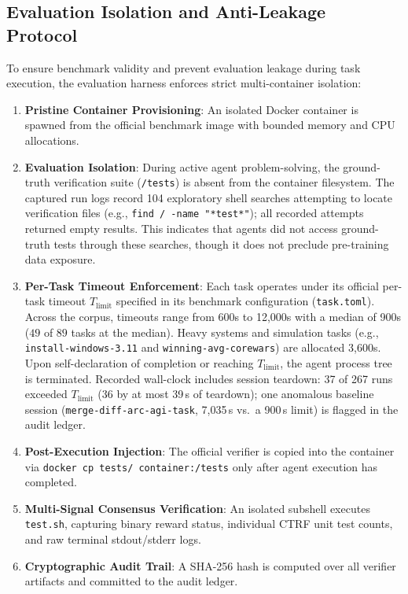 \subsection{Evaluation Isolation and Anti-Leakage Protocol}
To ensure benchmark validity and prevent evaluation leakage during task execution, the evaluation harness enforces strict multi-container isolation:
\begin{enumerate}
    \item \textbf{Pristine Container Provisioning}: An isolated Docker container is spawned from the official benchmark image with bounded memory and CPU allocations.
    \item \textbf{Evaluation Isolation}: During active agent problem-solving, the ground-truth verification suite (\texttt{/tests}) is absent from the container filesystem. The captured run logs record 104 exploratory shell searches attempting to locate verification files (e.g., \texttt{find / -name "*test*"}); all recorded attempts returned empty results. This indicates that agents did not access ground-truth tests through these searches, though it does not preclude pre-training data exposure.
    \item \textbf{Per-Task Timeout Enforcement}: Each task operates under its official per-task timeout $T_{\text{limit}}$ specified in its benchmark configuration (\texttt{task.toml}). Across the corpus, timeouts range from 600s to 12,000s with a median of 900s ($49$ of $89$ tasks at the median). Heavy systems and simulation tasks (e.g., \texttt{install-windows-3.11} and \texttt{winning-avg-corewars}) are allocated 3,600s. Upon self-declaration of completion or reaching $T_{\text{limit}}$, the agent process tree is terminated. Recorded wall-clock includes session teardown: 37 of 267 runs exceeded $T_{\text{limit}}$ (36 by at most 39\,s of teardown); one anomalous baseline session (\texttt{merge-diff-arc-agi-task}, 7{,}035\,s vs.\ a 900\,s limit) is flagged in the audit ledger.
    \item \textbf{Post-Execution Injection}: The official verifier is copied into the container via \texttt{docker cp tests/ container:/tests} only after agent execution has completed.
    \item \textbf{Multi-Signal Consensus Verification}: An isolated subshell executes \texttt{test.sh}, capturing binary reward status, individual CTRF unit test counts, and raw terminal stdout/stderr logs.
    \item \textbf{Cryptographic Audit Trail}: A SHA-256 hash is computed over all verifier artifacts and committed to the audit ledger.
\end{enumerate}

